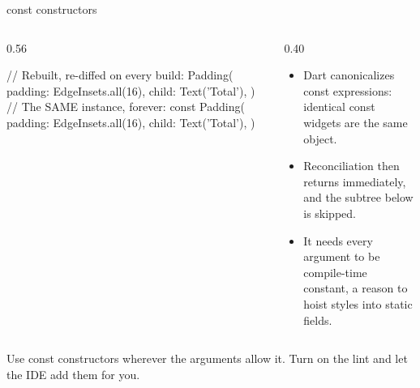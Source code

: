 \documentclass[10pt,aspectratio=169,t]{beamer}
\begin{document}
\begin{frame}[fragile,eyebrow=Optimization]{const constructors}
  \begin{columns}[T]
    \begin{column}{0.56\textwidth}
\begin{dart}
// Rebuilt, re-diffed on every build:
Padding(
  padding: EdgeInsets.all(16),
  child: Text('Total'),
)
// The SAME instance, forever:
const Padding(
  padding: EdgeInsets.all(16),
  child: Text('Total'),
)
\end{dart}
    \end{column}
    \begin{column}{0.40\textwidth}
      \begin{itemize}
        \item Dart canonicalizes const expressions: identical const widgets are the same object.
        \item Reconciliation then returns immediately, and the subtree below is skipped.
        \item It needs every argument to be compile-time constant, a reason to hoist styles into static fields.
      \end{itemize}
    \end{column}
  \end{columns}
  \begin{takeaway}{Use const constructors wherever the arguments allow it.}
    Turn on the  lint and let the IDE add them for you.
  \end{takeaway}
\end{frame}
\end{document}
